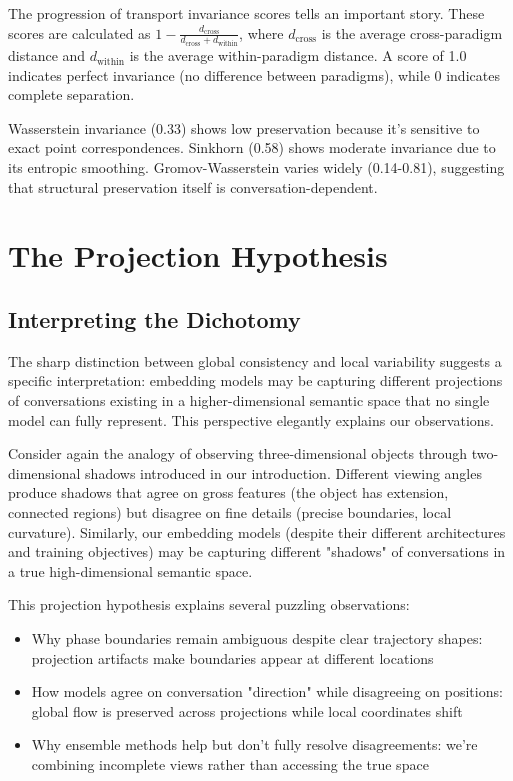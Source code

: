 \documentclass[11pt,letterpaper]{article}
\begin{document}
The progression of transport invariance scores tells an important story. These scores are calculated as $1 - \frac{d_{\text{cross}}}{d_{\text{cross}} + d_{\text{within}}}$, where $d_{\text{cross}}$ is the average cross-paradigm distance and $d_{\text{within}}$ is the average within-paradigm distance. A score of 1.0 indicates perfect invariance (no difference between paradigms), while 0 indicates complete separation.

Wasserstein invariance (0.33) shows low preservation because it's sensitive to exact point correspondences. Sinkhorn (0.58) shows moderate invariance due to its entropic smoothing. Gromov-Wasserstein varies widely (0.14-0.81), suggesting that structural preservation itself is conversation-dependent.

\section{The Projection Hypothesis}

\subsection{Interpreting the Dichotomy}

The sharp distinction between global consistency and local variability suggests a specific interpretation: embedding models may be capturing different projections of conversations existing in a higher-dimensional semantic space that no single model can fully represent. This perspective elegantly explains our observations.

Consider again the analogy of observing three-dimensional objects through two-dimensional shadows introduced in our introduction. Different viewing angles produce shadows that agree on gross features (the object has extension, connected regions) but disagree on fine details (precise boundaries, local curvature). Similarly, our embedding models (despite their different architectures and training objectives) may be capturing different "shadows" of conversations in a true high-dimensional semantic space.

This projection hypothesis explains several puzzling observations:
\begin{itemize}
\item Why phase boundaries remain ambiguous despite clear trajectory shapes: projection artifacts make boundaries appear at different locations
\item How models agree on conversation "direction" while disagreeing on positions: global flow is preserved across projections while local coordinates shift
\item Why ensemble methods help but don't fully resolve disagreements: we're combining incomplete views rather than accessing the true space
\end{itemize}
\end{document}
